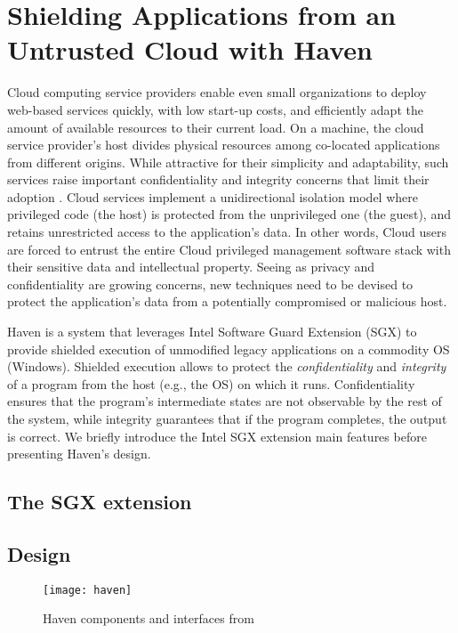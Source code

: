 \section{Shielding Applications from an Untrusted Cloud with Haven}

Cloud computing service providers enable even small organizations to deploy web-based services quickly, with low start-up costs, and efficiently adapt the amount of available resources to their current load.
On a machine, the cloud service provider's host divides physical resources among co-located applications from different origins.
While attractive for their simplicity and adaptability, such services raise important confidentiality and integrity concerns that limit their adoption \cite{mining,NSAYahoo}.
Cloud services implement a unidirectional isolation model where privileged code (the host) is protected from the unprivileged one (the guest), and retains unrestricted access to the application's data.
In other words, Cloud users are forced to entrust the entire Cloud privileged management software stack with their sensitive data and intellectual property.
Seeing as privacy and confidentiality are growing concerns, new techniques need to be devised to protect the application's data from a potentially compromised or malicious host.

Haven \cite{DBLP:journals/tocs/BaumannPH15} is a system that leverages Intel Software Guard Extension (SGX) \cite{SGXManual} to provide shielded execution of unmodified legacy applications on a commodity OS (Windows).
Shielded execution allows to protect the \emph{confidentiality} and \emph{integrity} of a program from the host (e.g., the OS) on which it runs.
Confidentiality ensures that the program's intermediate states are not observable by the rest of the system, while integrity guarantees that if the program completes, the output is correct.
We briefly introduce the Intel SGX extension main features before presenting Haven's design.

\subsection{The SGX extension}



\subsection{Design}

\begin{figure*}
	\centering
	\captionsetup{justification=centering}
  	\texttt{[image: haven]}
  	\caption{Haven components and interfaces from \cite{DBLP:journals/tocs/BaumannPH15}}
  	\label{stackOfHaven}
\end{figure*}

